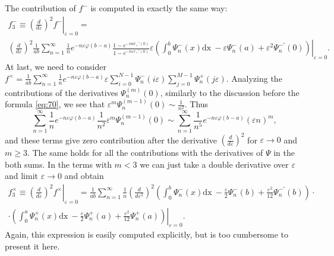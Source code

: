 \documentclass{article}
\newcommand{\dx}{\mathrm{dx}~}
\begin{document}
The contribution of $f^{-}$ is computed in exactly the same way:
\begin{multline}
  \label{eq:72}
   f^{-}_{3}\equiv \left.\left(\frac{d}{d\varepsilon}\right)^{2} f^{-}\right|_{\varepsilon=0} =\\
  \left.\left(\frac{d}{d\varepsilon}\right)^{2}\frac{1}{ab}\sum_{n=1}^{\infty} \frac{1}{n}
  e^{-n\varepsilon\varphi(b-a)} \frac{1-e^{-nar_{+}'(0)}}{1-e^{-n\varepsilon r_{+}'(0)}}
 \varepsilon\left(\int_{0}^{b} \Psi_{n}^{-}(x) \dx -\varepsilon \Psi_{n}^{-}(a) +\varepsilon^{2}\Psi^{-'}_{n}(0)\right)\right|_{\varepsilon=0}.
\end{multline}
At last, we need to consider
$f^{\times}=\frac{1}{ab}\sum_{n=1}^{\infty}\frac{1}{n}e^{-n\varepsilon\varphi(b-a)}\varepsilon\sum_{i=0}^{N-1}\Psi_{n}^{-}(i\varepsilon)
\sum_{j=0}^{M-1}\Psi_{n}^{+}(j\varepsilon)$. Analyzing the contributions of the derivatives
$\Psi_{n}^{(m)}(0)$, similarly to the discussion before the formula \eqref{eq:70}, we see that
$\varepsilon^{m}\Psi_{n}^{(m-1)}(0)\sim \frac{1}{n^{2}}$. Thus
\[\sum_{n=1}^{\infty}\frac{1}{n}e^{-n\varepsilon\varphi(b-a)}\frac{1}{n^{2}}\varepsilon^{m}\Psi_{n}^{(m-1)}(0)\sim
\sum_{n=1}^{\infty}\frac{1}{n^{5}}e^{-n\varepsilon\varphi(b-a)}(\varepsilon n)^{m},\] and these terms
give zero contribution after the derivative $\left(\frac{d}{d\varepsilon}\right)^{2}$ for
$\varepsilon\to 0 $ and $m\geq 3$. The same holds for all the contributions with the derivatives of
$\Psi$ in the both sums. In the terms with $m<3$ we can just take a double derivative over
$\varepsilon$ and limit $\varepsilon\to 0$ and obtain
\begin{multline}
  \label{eq:73}
   f^{\times}_{3}\equiv \left.\left(\frac{d}{d\varepsilon}\right)^{2}
    f^{\times}\right|_{\varepsilon=0}=\left.\frac{1}{ab}\sum_{n=1}^{\infty}\frac{1}{n}
  \left(\frac{d}{d\varepsilon^{2}}\right)^{2}\left(\int_{0}^{b}\Psi^{-}_{n}(x)\dx
    -\frac{\varepsilon}{2}\Psi^{-}_{n}(b)+\frac{\varepsilon^{2}}{12}\Psi^{-'}_{n}(b)\right)\cdot\right.\\
\cdot\left.\left(\int_{0}^{a}\Psi^{+}_{n}(x)\dx-\frac{\varepsilon}{2}\Psi^{+}_{n}(a)+
    \frac{\varepsilon^{2}}{12}\Psi^{+}_{n}(a)\right)\right|_{\varepsilon=0}.
\end{multline}
Again, this expression is easily computed explicitly, but is too cumbersome to present it here.
\end{document}
